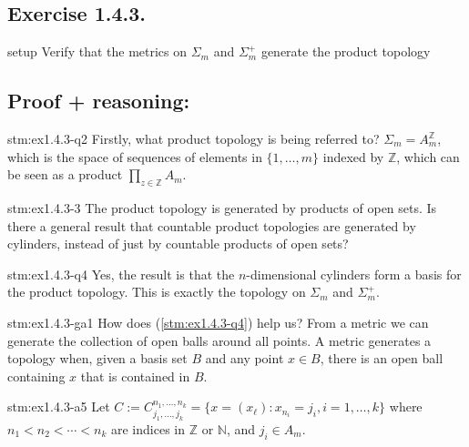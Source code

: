 \subsection*{Exercise 1.4.3.}

\begin{exercise}{setup}
Verify that the metrics on $\Sigma_m$ and $\Sigma_m^+$ generate the product topology
\end{exercise}

\subsection*{Proof {\color{blue} + reasoning}:}

\begin{explanation}{stm:ex1.4.3-q2}
Firstly, what product topology is being referred to? $\Sigma_m = A_m^{\mathbb{Z}}$, which is the space of sequences of elements in $\{1,\ldots,m\}$ indexed by $\mathbb{Z}$, which can be seen as a product $\prod_{z \in \mathbb{Z}} A_m$.
\end{explanation}

\begin{explanation}{stm:ex1.4.3-3}
The product topology is generated by products of open sets. Is there a general result that countable product topologies are generated by cylinders, instead of just by countable products of open sets?
\end{explanation}

\begin{explanation}{stm:ex1.4.3-q4}
Yes, the result is that the $n$-dimensional cylinders form a basis for the product topology. This is exactly the topology on $\Sigma_m$ and $\Sigma_m^+$.
\end{explanation}

\begin{explanation}{stm:ex1.4.3-ga1}
How does (\ref{stm:ex1.4.3-q4}) help us? From a metric we can generate the collection of open balls around all points. A metric generates a topology when, given a basis set $B$ and any point $x \in B$, there is an open ball containing $x$ that is contained in $B$.
\end{explanation}

\begin{statement}{stm:ex1.4.3-a5}
Let $C := C_{j_1,\ldots,j_k}^{n_1,\ldots,n_k} = \{ x = (x_\ell) : x_{n_i} = j_i, i=1,\ldots,k \}$ where $n_1 < n_2 < \cdots < n_k$ are indices in $\mathbb{Z}$ or $\mathbb{N}$, and $j_i \in A_m$.
\end{statement}

